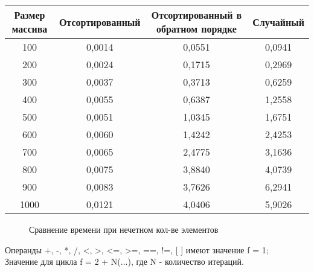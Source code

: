 \begin{center}
	\begin{tabular}{|c|c|c|c|}
		\hline
		Размер массива & Отсортированный & Отсортированный в обратном порядке & Случайный\\
		
		\hline
		100 & 0,0014 & 0,0551 & 0,0941 \\
		
		\hline
		200 & 0,0024 & 0,1715 & 0,2969 \\
		
		\hline
		300 & 0,0037 & 0,3713 & 0,6259 \\
		
		\hline
		400 & 0,0055 & 0,6387 & 1,2558 \\
		
		\hline
		500 & 0,0051 & 1,0345 & 1,6751 \\
		
		\hline
		600 & 0,0060 & 1,4242 & 2,4253 \\
		
		\hline
		700 & 0,0065 & 2,4775 & 3,1636 \\
		
		\hline
		800 & 0,0075 & 3,8840 & 4,0739 \\
		
		\hline
		900 & 0,0083 & 3,7626 & 6,2941 \\
		
		\hline
		1000 & 0,0121 & 4,0406 & 5,9026 \\
		
		\hline
		
		
	\end{tabular}
\end{center}	



\newpage

\begin{figure}[h!]	
	\begin{minipage}[h]{\linewidth}
		\caption{Сравнение времени при нечетном кол-ве элементов}
	\end{minipage}
\end{figure}

\flushleft
Операнды +, -, *, /, <, >, <=, >=, ==, !=, [ ] имеют значение f = 1;\\
Значение для цикла f = 2 + N(...), где N - количество итераций.

